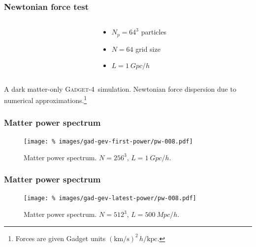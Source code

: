 \documentclass{beamer}
\makeatletter
\newcommand{\mylabel}{%
}
\newcommand{\gadget}{\textsc{Gadget-4}}
\makeatother
\begin{document}
\begin{frame}[label=forcetest2]
    \frametitle{Newtonian force test\mylabel}
    \vspace*{-.5cm}
    \begin{columns}
        \begin{column}{.65\textwidth}
        \end{column}
        \begin{column}{.35\textwidth}
            \begin{itemize}
               \item $N_p = 64^3$ particles
               \item $N = 64$ grid size
               \item $L = \SI{1}{Gpc}/h$
            \end{itemize}
        \end{column}
    \end{columns}
    \small A dark matter-only \gadget\ simulation. Newtonian force dispersion
    due to numerical approximations.\footnote{Forces are given Gadget units
    $(\text{km/s})^2\, h/\text{kpc}$.}
\end{frame}

\begin{frame}[label=matterpower]
    \frametitle{Matter power spectrum\mylabel}
    \vspace*{-.5cm}
    \begin{figure}
    \centering\texttt{[image: \%
        images/gad-gev-first-power/pw-008.pdf]}%
        \caption{Matter power spectrum. $N=256^3$, $L=\SI{1}{Gpc}/h$.}
    \end{figure}
\end{frame}

\begin{frame}[label=matterpower2]
    \frametitle{Matter power spectrum\mylabel}
    \vspace*{-.5cm}
    \begin{figure}
    \centering\texttt{[image: \%
        images/gad-gev-latest-power/pw-008.pdf]}%
        \caption{Matter power spectrum. $N=512^3$, $L=\SI{500}{Mpc}/h$.}
    \end{figure}
\end{frame}
\end{document}
